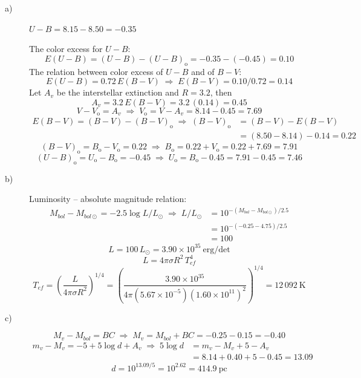 \begin{description}
\item[a)] $U - B = 8.15 - 8.50 = -0.35$

The color excess for $U-B$:
\[
E(U-B) = (U-B) - (U-B)_{\mathrm{o}} = -0.35 - (-0.45) = 0.10
\]
The relation between color excess of $U-B$ and of $B-V$:
\[
E(U-B) = 0.72\,E(B-V)
\;\Longrightarrow\;
E(B-V) = 0.10/0.72 = 0.14 \tag*{(15\%)}
\]
Let $A_v$ be the interstellar extinction and $R = 3.2$, then
\[
A_v = 3.2\,E(B-V) = 3.2\,(0.14) = 0.45
\]
\[
V - V_{\mathrm{o}} = A_v
\;\Longrightarrow\;
V_{\mathrm{o}} = V - A_v = 8.14 - 0.45 = 7.69
\]
\begin{align*}
E(B-V) = (B-V) - (B-V)_{\mathrm{o}}
\;\Longrightarrow\;
(B-V)_{\mathrm{o}} &= (B-V) - E(B-V)\\
&= (8.50 - 8.14) - 0.14 = 0.22 \tag*{(15\%)}
\end{align*}
\[
(B-V)_{\mathrm{o}} = B_{\mathrm{o}} - V_{\mathrm{o}} = 0.22
\;\Longrightarrow\;
B_{\mathrm{o}} = 0.22 + V_{\mathrm{o}} = 0.22 + 7.69 = 7.91 \tag*{(10\%)}
\]
\[
(U-B)_{\mathrm{o}} = U_{\mathrm{o}} - B_{\mathrm{o}} = -0.45
\;\Longrightarrow\;
U_{\mathrm{o}} = B_{\mathrm{o}} - 0.45 = 7.91 - 0.45 = 7.46 \tag*{(10\%)}
\]

\item[b)] Luminosity -- absolute magnitude relation:
\begin{align*}
M_{bol} - M_{bol\odot} = -2.5 \log L/L_\odot
\;\Longrightarrow\;
L/L_\odot &= 10^{-(M_{bol} - M_{bol\odot})/2.5}\\
&= 10^{-(-0.25 - 4.75)/2.5}\\
&= 100 \tag*{(10\%)}
\end{align*}
\[
L = 100\,L_\odot = 3.90 \times 10^{35}~\mathrm{erg/det}
\]
\[
L = 4\pi\sigma R^2\,T_{ef}^4
\]
\[
T_{ef} = \left( \frac{L}{4\pi\sigma R^2} \right)^{\!1/4}
  = \left( \frac{3.90 \times 10^{35}}
                {4\pi (5.67 \times 10^{-5})(1.60 \times 10^{11})^2}
    \right)^{\!1/4}
  = 12\,092~\mathrm{K} \tag*{(15\%)}
\]

\item[c)]
\[
M_v - M_{bol} = BC
\;\Longrightarrow\;
M_v = M_{bol} + BC = -0.25 - 0.15 = -0.40 \tag*{(10\%)}
\]
\begin{align*}
m_v - M_v = -5 + 5 \log d + A_v
\;\Longrightarrow\;
5 \log d &= m_v - M_v + 5 - A_v\\
&= 8.14 + 0.40 + 5 - 0.45 = 13.09
\end{align*}
\[
d = 10^{13.09/5} = 10^{2.62} = 414.9~\mathrm{pc} \tag*{(15\%)}
\]
\end{description}

